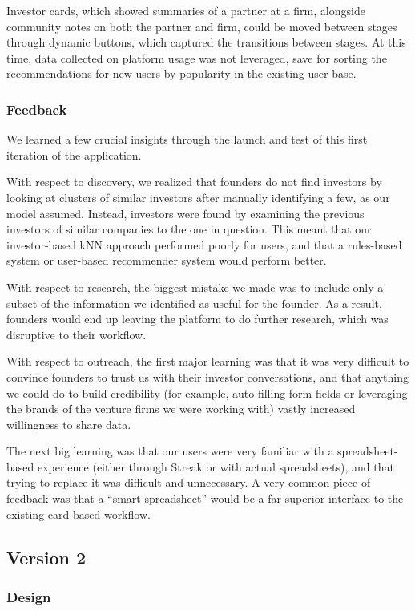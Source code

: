 Investor cards, which showed summaries of a partner at a firm, alongside community notes on both the partner and firm, could be moved between stages through dynamic buttons, which captured the transitions between stages. At this time, data collected on platform usage was not leveraged, save for sorting the recommendations for new users by popularity in the existing user base.

\subsubsection{Feedback}

We learned a few crucial insights through the launch and test of this first iteration of the application.

With respect to discovery, we realized that founders do not find investors by looking at clusters of similar investors after manually identifying a few, as our model assumed. Instead, investors were found by examining the previous investors of similar companies to the one in question. This meant that our investor-based kNN approach performed poorly for users, and that a rules-based system or user-based recommender system would perform better.

With respect to research, the biggest mistake we made was to include only a subset of the information we identified as useful for the founder. As a result, founders would end up leaving the platform to do further research, which was disruptive to their workflow.

With respect to outreach, the first major learning was that it was very difficult to convince founders to trust us with their investor conversations, and that anything we could do to build credibility (for example, auto-filling form fields or leveraging the brands of the venture firms we were working with) vastly increased willingness to share data.

The next big learning was that our users were very familiar with a spreadsheet-based experience (either through Streak or with actual spreadsheets), and that trying to replace it was difficult and unnecessary. A very common piece of feedback was that a ``smart spreadsheet'' would be a far superior interface to the existing card-based workflow.

\subsection{Version 2}

\subsubsection{Design}


